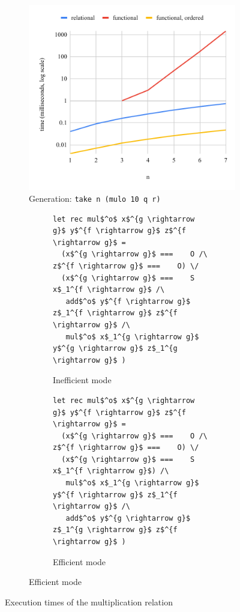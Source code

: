 \begin{figure}[h]
\hfill

    \begin{subfigure}[b]{0.49\textwidth}
      \includegraphics[width=\textwidth]{fig/muloIOO.pdf}
    \caption{Generation: \lstinline{take n (mulo 10 q r)}}
    \label{fig:mulo_IOO}
  \end{subfigure}
\hfill
  \begin{subfigure}[b]{0.45\textwidth}
    \begin{subfigure}[b]{\textwidth}
    \begin{lstlisting}[frame=tb]
let rec mul$^o$ x$^{g \rightarrow g}$ y$^{f \rightarrow g}$ z$^{f \rightarrow g}$ =
  (x$^{g \rightarrow g}$ ===    O /\ z$^{f \rightarrow g}$ ===    O) \/
  (x$^{g \rightarrow g}$ ===    S x$_1^{f \rightarrow g}$ /\
   add$^o$ y$^{f \rightarrow g}$ z$_1^{f \rightarrow g}$ z$^{f \rightarrow g}$ /\
   mul$^o$ x$_1^{g \rightarrow g}$ y$^{g \rightarrow g}$ z$_1^{g \rightarrow g}$ )
    \end{lstlisting}
    \caption{Inefficient mode}
    \label{fig:mult_modded_bad}
  \end{subfigure}
  \hfill

    \begin{subfigure}[b]{\textwidth}
    \begin{lstlisting}[frame=tb]
let rec mul$^o$ x$^{g \rightarrow g}$ y$^{f \rightarrow g}$ z$^{f \rightarrow g}$ =
  (x$^{g \rightarrow g}$ ===    O /\ z$^{f \rightarrow g}$ ===    O) \/
  (x$^{g \rightarrow g}$ ===    S x$_1^{f \rightarrow g}$) /\
   mul$^o$ x$_1^{g \rightarrow g}$ y$^{f \rightarrow g}$ z$_1^{f \rightarrow g}$ /\
   add$^o$ y$^{g \rightarrow g}$ z$_1^{g \rightarrow g}$ z$^{f \rightarrow g}$ )
    \end{lstlisting}
    \caption{Efficient mode}
    \label{fig:mult_modded_good}
  \end{subfigure}
  \end{subfigure}

  \caption{Execution times of the multiplication relation}
  \label{fig:mulo_time}
\end{figure}

